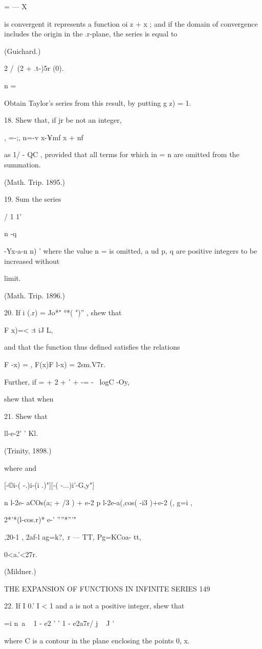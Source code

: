 {{  = — X

is convergent it represents a function oi z + x ; and if the domain of
convergence includes the origin in the .r-plane, the series is equal
to

(Guichard.)

2 /\ (2 + .t-)5r (0).

n =

Obtain Taylor's series from this result, by putting g z) = 1.

18. Shew that, if jr be not an integer,

, =-;, n=-v x-¥mf x + nf

as 1/ - QC , provided that all terms for which in = n are omitted from
the summation.

(Math. Trip. 1895.)

19. Sum the series

  / 1 1'

n -q \ \ {-Yx-a-n n) ' where the value n = is omitted, a ud p, q are
positive integers to be increased without

limit.

(Math. Trip. 1896.)

20. If i (.r) = Jo*" °*( ")'' , shew that

F x)=< :t iJ L,

and that the function thus defined satisfies the relations

F -x) = , F(x)F l-x) = 2sm.V7r.

Further, if = + 2 + ' + -= - \ logC -Oy,

shew that when

21. Shew that

ll-e-2' ' Kl.

(Trinity, 1898.)

where and

[-©i-( -.)i-(i .)"][-( -...)i'-G,y"]

n l-2e- aCOs(a; + /3 ) + e-2 p l-2e-a(,cos( -i3 )+e-2 (, g=i ,

2*'*(l-cos.r)* e-' ''''*'''"

,20-1 , 2af-l ag=k?,\ r — TT, Pg=KCoa- tt,

0<a.'<27r.

(Mildner.)

THE EXPANSION OF FUNCTIONS IN INFINITE SERIES 149

22. If I 0.' I < 1 and a is not a positive integer, shew that

 =i n~a ~ 1 - e2 ' ' 1 - e2a7r/ j ~ J '

where C is a contour in the plane enclosing the points 0, x.

}}}
